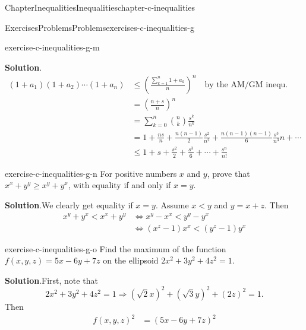 \documentclass[oneside,10pt,]{book}
\newcommand{\blocktitlefont}{\relax}
\numberwithin{equation}{section}
\newcommand{\lt}{<}
\begin{document}
\begin{chapterptx}{Chapter}{Inequalities}{}{Inequalities}{}{}{chapter-c-inequalities}
\begin{exercises-section}{Exercises}{Problems}{}{Problems}{}{}{exercises-c-inequalities-g}
\begin{divisionexercise}{12}{}{}{exercise-c-inequalities-g-m}
\par\smallskip%
\noindent\textbf{\blocktitlefont Solution}.\hypertarget{solution-c-inequalities-g-m-b}{}\quad{}%
\begin{equation*}
\begin{split}
(1+a_1)(1+a_2)\cdots(1+a_n) &\leq \left(\frac{\sum_{k=1}^n 1+a_k}{n}\right)^n \quad \textrm{by the AM/GM inequ.}\\
&=\left(\frac{n+s}{n}\right)^n\\
&=\sum_{k=0}^n \binom{n}{k} \frac{s^k}{n^k}\\
&=1 + \frac{n s}{n} + \frac{n(n-1)}{2} \frac{s^2}{n^2}+ \frac{n(n-1)(n-1)}{6} \frac{s^3}{n^3}n +\cdots\\
&\leq  1 + s + \frac{s^2}{2} + \frac{s^3}{6}+ \cdots + \frac{s^n}{n!}
\end{split}
\end{equation*}
%
\end{divisionexercise}%
\begin{divisionexercise}{13}{}{}{exercise-c-inequalities-g-n}%
For positive numbers \(x\) and \(y\), prove that \(x^x+y^y\geq x^y+ y^x\), with equality if and only if \(x=y\).%
\par\smallskip%
\noindent\textbf{\blocktitlefont Solution}.\hypertarget{solution-c-inequalities-g-n-b}{}\quad{}We clearly get equality if \(x = y\).  Assume \(x \lt y\) and \(y =x + z\).  Then%
\begin{equation*}
\begin{split}
x^y + y^x \lt x^x + y^y  & \Leftrightarrow x^y - x^x \lt y^y-y^x\\
& \Leftrightarrow  (x^z-1)x^x \lt  (y^z-1)y^x
\end{split}
\end{equation*}
%
\end{divisionexercise}%
\begin{divisionexercise}{14}{}{}{exercise-c-inequalities-g-o}%
Find the maximum of the function \(f(x,y,z)=5x -6y+7z\) on the ellipsoid \(2x^2+3y^2+4z^2=1\).%
\par\smallskip%
\noindent\textbf{\blocktitlefont Solution}.\hypertarget{solution-c-inequalities-g-o-b}{}\quad{}First, note that%
\begin{equation*}
2x^2+3y^2+4z^2=1 \Rightarrow  (\sqrt{2}x)^2 +(\sqrt{3}y)^2 + (2z)^2 =1.
\end{equation*}
Then%
\begin{equation*}
\begin{split}
f(x, y, z)^2 & = (5x - 6y +7z)^2\\

\end{split}
\end{equation*}
\end{divisionexercise}
\end{exercises-section}
\end{chapterptx}
\end{document}
